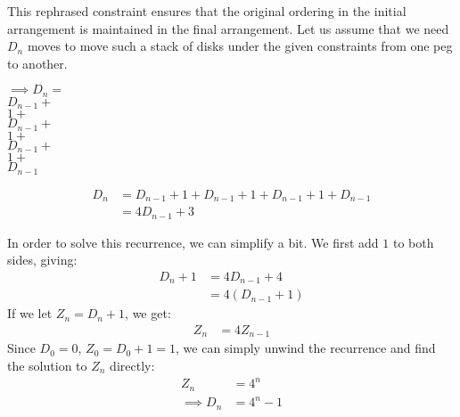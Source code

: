 This rephrased constraint ensures that the original ordering in the initial arrangement is maintained in the final arrangement. Let us assume that we need $D_{n}$ moves to move such a stack of disks under the given constraints from one peg to another.
\clearpage

 $\implies D_n = $\\
 $D_{n-1} +$\\
 $1 +$\\
 $D_{n-1}+$ \\
 $1+$\\
 $D_{n-1}+$\\
 $1+$\\
 $D_{n-1}$

\begin{align}
    D_n & = D_{n-1} + 1 + D_{n-1} + 1 + D_{n-1} + 1 + D_{n-1} \nonumber \\
        & = 4D_{n-1} + 3
\end{align}

In order to solve this recurrence, we can simplify a bit. We first add $1$ to both sides, giving:
\begin{align*}
    D_n + 1 & = 4D_{n-1} + 4  \\
            & =4(D_{n-1} + 1)
\end{align*}
If we let $Z_n = D_n + 1$, we get:
\begin{align*}
    Z_n & = 4Z_{n-1}
\end{align*}
Since $D_0=0$, $Z_0 = D_0 + 1 = 1$, we can simply unwind the recurrence and find the solution to $Z_n$ directly:
\begin{align*}
    Z_n          & = 4^n   \\
    \implies D_n & = 4^n-1
\end{align*}
\clearpage

